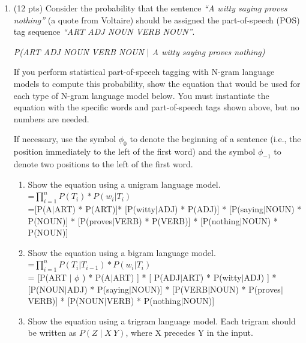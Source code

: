 \documentclass[11pt]{article}
\begin{document}
\begin{enumerate}
\begin{enumerate}
\end{enumerate}


\newpage

\item (12 pts) Consider the   probability that the sentence {\it ``A
    witty saying proves nothing''} 
  (a quote from Voltaire) should be assigned the 
  part-of-speech (POS) tag sequence {\it ``ART ADJ NOUN VERB NOUN''}. 

\begin{center}
{\it P(ART ADJ NOUN VERB NOUN $\mid$ A witty saying proves nothing)}
\end{center}

If you perform statistical part-of-speech tagging with N-gram language
models to compute  this probability, show the equation that would
be used for each type of N-gram language model below. 
You must instantiate the equation with the specific words and
part-of-speech tags shown above, but no numbers are needed. 

If necessary, use the symbol $\phi_{0}$ to denote the beginning of a
sentence (i.e., the position immediately to the left of the first
word) and the symbol $\phi_{-1}$ to denote two positions to the left
of the first word.

\begin{enumerate}
\item Show the equation using a unigram language model. \\
=$\prod\limits_{i=1}^{n} P(T_i) * P(w_i |T_i)$\\

=[P(A$|$ART) * P(ART)]*  [P(witty$|$ADJ) * P(ADJ)] * [P(saying$|$NOUN) * P(NOUN)] * [P(proves$|$VERB) * P(VERB)] * [P(nothing$|$NOUN) * P(NOUN)] \\

\item Show the equation using a bigram language model. \\ 

=$\prod\limits_{i=1}^{n} P(T_i | T_{i-1}) * P(w_i |T_i)$\\
= [P(ART $|$ $\phi$ ) * P(A$|$ART) ] * [ P(ADJ$|$ART) * P(witty$|$ADJ) ] * [P(NOUN$|$ADJ) * P(saying$|$NOUN)] *
[P(VERB$|$NOUN) * P(proves$|$VERB)] * [P(NOUN$|$VERB) * P(nothing$|$NOUN)] \\

\item Show the equation using a trigram language model.
Each trigram should be written as $P(Z \mid X~Y)$, where X
precedes Y in the input. \\


\end{enumerate}
\end{enumerate}
\end{document}
